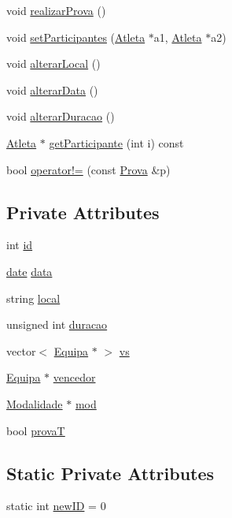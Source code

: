 \begin{DoxyCompactItemize}
void \hyperlink{class_prova_a764dbe22b80d1537c3d146f431d91000}{realizar\+Prova} ()
\item 
void \hyperlink{class_prova_a639f48a55d8036891b21f4710a484eb0}{set\+Participantes} (\hyperlink{class_atleta}{Atleta} $\ast$a1, \hyperlink{class_atleta}{Atleta} $\ast$a2)
\item 
void \hyperlink{class_prova_a7aa6cf33af7e00acd82a6f0e0ca97db5}{alterar\+Local} ()
\item 
void \hyperlink{class_prova_a1daf40fca9ecb8e32b605914069eb36b}{alterar\+Data} ()
\item 
void \hyperlink{class_prova_afbf600163e412ea3b1ba10788396163d}{alterar\+Duracao} ()
\item 
\hyperlink{class_atleta}{Atleta} $\ast$ \hyperlink{class_prova_a34d362f2cfa3c77966e0644203aae796}{get\+Participante} (int i) const 
\item 
bool \hyperlink{class_prova_afc694469d1207f16ffb9525fe2ffda81}{operator!=} (const \hyperlink{class_prova}{Prova} \&p)
\end{DoxyCompactItemize}
\subsection*{Private Attributes}
\begin{DoxyCompactItemize}
\item 
int \hyperlink{class_prova_a23b51edf66d26661629b5330db67c3e7}{id}
\item 
\hyperlink{structdate}{date} \hyperlink{class_prova_a534b71e749122e706bbdd68e6b3410f4}{data}
\item 
string \hyperlink{class_prova_a4ff729b96dc2198a40d05dc7fdc38081}{local}
\item 
unsigned int \hyperlink{class_prova_a858c1f2a4be696df02eebe6419c34dc5}{duracao}
\item 
vector$<$ \hyperlink{class_equipa}{Equipa} $\ast$ $>$ \hyperlink{class_prova_aa085e9c4905e762142b6b735f4dfda30}{vs}
\item 
\hyperlink{class_equipa}{Equipa} $\ast$ \hyperlink{class_prova_a9da09789da7cc0ef43b38197c96558fc}{vencedor}
\item 
\hyperlink{class_modalidade}{Modalidade} $\ast$ \hyperlink{class_prova_a9a372fdc63a673192aca93e5b3cdba22}{mod}
\item 
bool \hyperlink{class_prova_a9b551ecafa591456d49345ceb9ea790d}{prova\+T}
\end{DoxyCompactItemize}
\subsection*{Static Private Attributes}
\begin{DoxyCompactItemize}
\item 
static int \hyperlink{class_prova_aeaa338e40106c1be53f3f1134d3fb942}{new\+I\+D} = 0
\end{DoxyCompactItemize}


